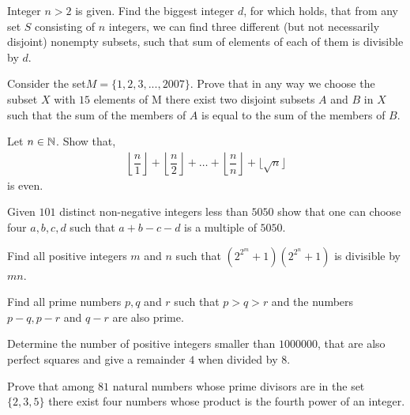 \documentclass[problems.tex]{subfile}
\begin{document}
	\begin{problem}
		Integer $n>2$ is given. Find the biggest integer $d$, for which holds, that from any set $S$ consisting of $n$ integers, we can find three different (but not necessarily disjoint) nonempty subsets, such that sum of elements of each of them is divisible by $d$.
	\end{problem}
	
	\begin{problem}
		Consider the set$ M = \{1, 2, 3, . . . , 2007\}$. Prove that in any way we choose the subset $X$ with $15$ elements of M there exist two disjoint subsets         $A$ and $B$ in $X$ such that the sum of the members of $A$ is equal to the sum of the members of $B$.
	\end{problem}
	
	\begin{problem}[India $2014$]
		Let $n\in\mathbb{N}$. Show that,	
			\begin{align*}
				\left\lfloor\dfrac{n}{1}\right\rfloor+\left\lfloor\dfrac{n}{2}\right\rfloor+\ldots+\left\lfloor\dfrac{n}{n}\right\rfloor+
				\lfloor\sqrt{n}\rfloor
			\end{align*}
		is even.
	\end{problem}
	
	\begin{problem}
		Given $101$ distinct non-negative integers less than $5050$ show that one can choose four $a, b, c, d$ such that $a + b - c - d$ is a multiple of $5050$.
	\end{problem}
	
	\begin{problem}
		Find all positive integers $m$ and $n$ such that $\left(2^{2^m}+1\right)\left(2^{2^n}+1\right)$ is divisible by $mn$.
	\end{problem}
	
	\begin{problem}[Slovenia $2010$]
		Find all prime numbers $p, q$ and $r$ such that $p > q > r$ and the numbers $p-q,p-r$ and $q-r$ are also prime.
	\end{problem}
	
	\begin{problem}
		Determine the number of positive integers smaller than $1000000$, that are also perfect squares and give a remainder $4$ when divided by $8$.
	\end{problem}
	
	\begin{problem}
		Prove that among $81$ natural numbers whose prime divisors are in the set $\{2, 3, 5\}$ there exist four numbers whose product is the fourth power of an integer.
	\end{problem}
	
\end{document}
